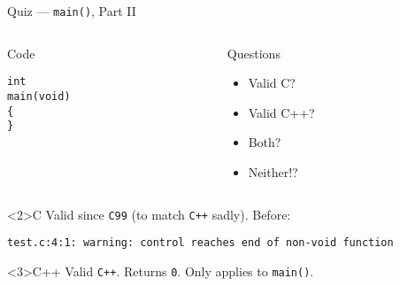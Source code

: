 \documentclass[presentation,aspectratio=169]{beamer}
\begin{document}
\begin{frame}[fragile,label={sec:org23c4234}]{Quiz — \texttt{main()}, Part II}
 \begin{columns}
\begin{column}{0.48\columnwidth}
\begin{block}{Code}
\begin{verbatim}
int
main(void)
{
}
\end{verbatim}
\end{block}
\end{column}

\begin{column}{0.48\columnwidth}
\begin{block}{Questions}
\begin{itemize}
\item Valid C?
\item Valid C++?
\item Both?
\item Neither!?
\end{itemize}
\end{block}
\end{column}
\end{columns}

\begin{block}<2>{C}
Valid since \texttt{C99} (to match \texttt{C++} sadly). Before:
\begin{verbatim}
test.c:4:1: warning: control reaches end of non-void function
\end{verbatim}
\end{block}

\vspace{-2cm}
\begin{block}<3>{C++}
Valid \texttt{C++}. Returns \texttt{0}. Only applies to \texttt{main()}.
\end{block}
\end{frame}

\end{document}
